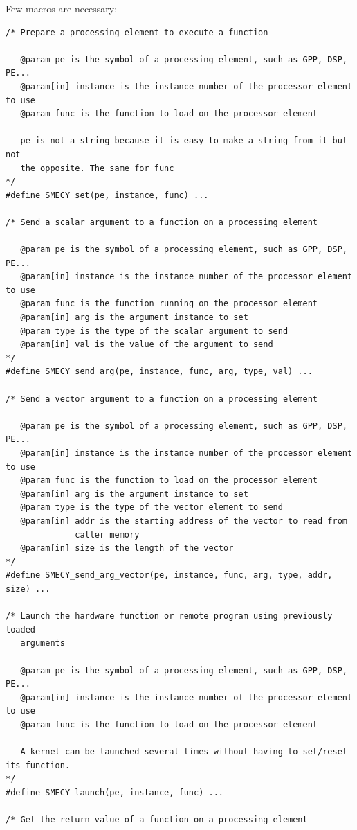 \documentclass[a4paper]{article}
\begin{document}
Few macros are necessary:
\begin{lstlisting}
/* Prepare a processing element to execute a function

   @param pe is the symbol of a processing element, such as GPP, DSP, PE...
   @param[in] instance is the instance number of the processor element to use
   @param func is the function to load on the processor element

   pe is not a string because it is easy to make a string from it but not
   the opposite. The same for func
*/
#define SMECY_set(pe, instance, func) ...

/* Send a scalar argument to a function on a processing element

   @param pe is the symbol of a processing element, such as GPP, DSP, PE...
   @param[in] instance is the instance number of the processor element to use
   @param func is the function running on the processor element
   @param[in] arg is the argument instance to set
   @param type is the type of the scalar argument to send
   @param[in] val is the value of the argument to send
*/
#define SMECY_send_arg(pe, instance, func, arg, type, val) ...

/* Send a vector argument to a function on a processing element

   @param pe is the symbol of a processing element, such as GPP, DSP, PE...
   @param[in] instance is the instance number of the processor element to use
   @param func is the function to load on the processor element
   @param[in] arg is the argument instance to set
   @param type is the type of the vector element to send
   @param[in] addr is the starting address of the vector to read from
              caller memory
   @param[in] size is the length of the vector
*/
#define SMECY_send_arg_vector(pe, instance, func, arg, type, addr, size) ...

/* Launch the hardware function or remote program using previously loaded
   arguments

   @param pe is the symbol of a processing element, such as GPP, DSP, PE...
   @param[in] instance is the instance number of the processor element to use
   @param func is the function to load on the processor element

   A kernel can be launched several times without having to set/reset its function.
*/
#define SMECY_launch(pe, instance, func) ...

/* Get the return value of a function on a processing element


\end{lstlisting}
\end{document}
